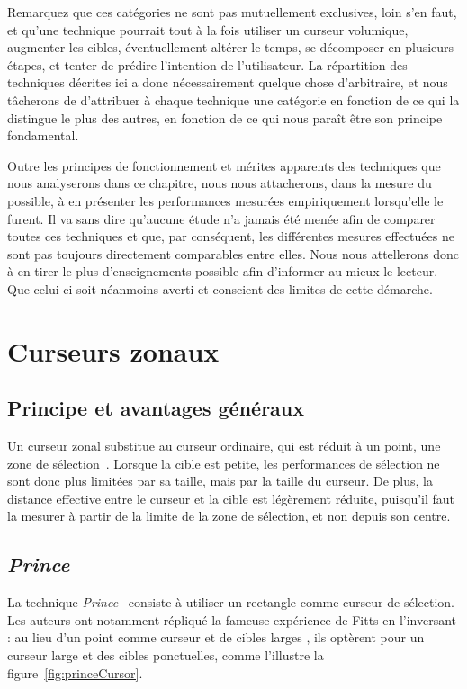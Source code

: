 	Remarquez que ces catégories ne sont pas mutuellement exclusives, loin s'en faut, et qu'une technique pourrait tout à la fois utiliser un curseur volumique, augmenter les cibles, éventuellement altérer le temps, se décomposer en plusieurs étapes, et tenter de prédire l'intention de l'utilisateur. La répartition des techniques décrites ici a donc nécessairement quelque chose d'arbitraire, et nous tâcherons de d'attribuer à chaque technique une catégorie en fonction de ce qui la distingue le plus des autres, en fonction de ce qui nous paraît être son principe fondamental.
	
	Outre les principes de fonctionnement et mérites apparents des techniques que nous analyserons dans ce chapitre, nous nous attacherons, dans la mesure du possible, à en présenter les performances mesurées empiriquement lorsqu'elle le furent. Il va sans dire qu'aucune étude n'a jamais été menée afin de comparer toutes ces techniques et que, par conséquent, les différentes mesures effectuées ne sont pas toujours directement comparables entre elles. Nous nous attellerons donc à en tirer le plus d'enseignements possible afin d'informer au mieux le lecteur. Que celui-ci soit néanmoins averti et conscient des limites de cette démarche.

\section{Curseurs zonaux}
	\subsection{Principe et avantages généraux}
	Un curseur zonal substitue au curseur ordinaire, qui est réduit à un point, une zone de sélection~\cite{kabbash1995prince, worden1997making}. Lorsque la cible est petite, les performances de sélection ne sont donc plus limitées par sa taille, mais par la taille du curseur. De plus, la distance effective entre le curseur et la cible est légèrement réduite, puisqu'il faut la mesurer à partir de la limite de la zone de sélection, et non depuis son centre.
	
	\subsection{\emph{Prince}}
	La technique \emph{Prince}~\cite{kabbash1995prince} consiste à utiliser un rectangle comme curseur de sélection. Les auteurs ont notamment répliqué la fameuse expérience de Fitts en l'inversant : au lieu d'un point comme curseur et de cibles \og larges \fg{} , ils optèrent pour un curseur large et des cibles ponctuelles, comme l'illustre la figure~\ref{fig:princeCursor}.
	
